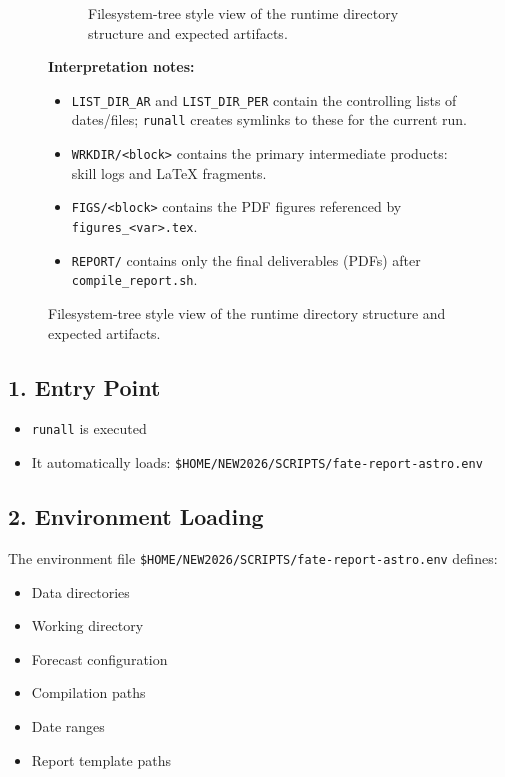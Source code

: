 \documentclass[a4paper,11pt]{article}
\begin{document}
\begin{figure}[H]
\begin{figure}[H]
\begin{tikzpicture}
\end{tikzpicture}
\caption{Filesystem-tree style view of the runtime directory structure and expected artifacts.}
\label{fig:filesystem-tree}
\end{figure}

\noindent\textbf{Interpretation notes:}
\begin{itemize}
  \item \texttt{LIST\_DIR\_AR} and \texttt{LIST\_DIR\_PER} contain the controlling lists of dates/files; \texttt{runall} creates symlinks to these for the current run.
  \item \texttt{WRKDIR/<block>} contains the primary intermediate products: skill logs and LaTeX fragments.
  \item \texttt{FIGS/<block>} contains the PDF figures referenced by \texttt{figures\_<var>.tex}.
  \item \texttt{REPORT/} contains only the final deliverables (PDFs) after \texttt{compile\_report.sh}.
\end{itemize}

\end{figure}


\subsection*{1. Entry Point}

\begin{itemize}
    \item \texttt{runall} is executed
    \item It automatically loads: \texttt{\$HOME/NEW2026/SCRIPTS/fate-report-astro.env}
\end{itemize}

\subsection*{2. Environment Loading}

The environment file \texttt{\$HOME/NEW2026/SCRIPTS/fate-report-astro.env} defines:

\begin{itemize}
    \item Data directories
    \item Working directory
    \item Forecast configuration
    \item Compilation paths
    \item Date ranges
    \item Report template paths
\end{itemize}
\end{document}
